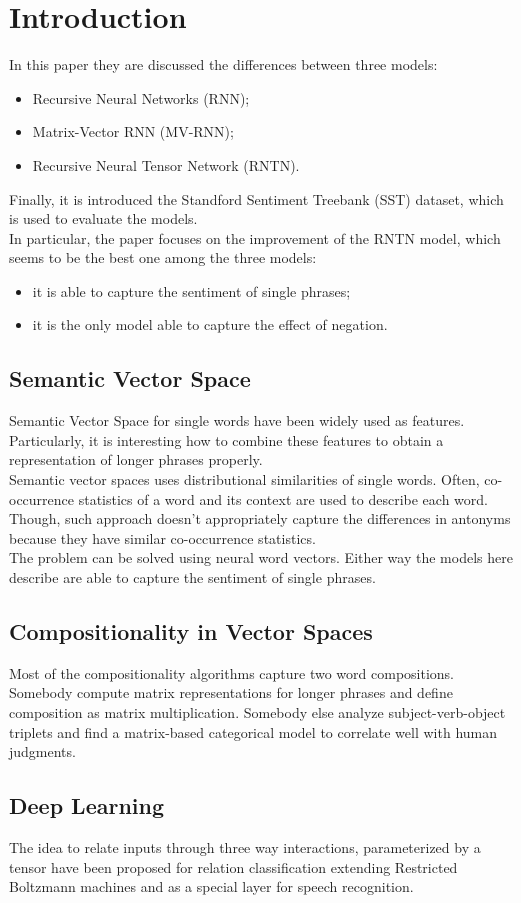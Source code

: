 \section{Introduction}

In this paper they are discussed the differences between three models:
\begin{itemize}
	\item Recursive Neural Networks (RNN);
	\item Matrix-Vector RNN (MV-RNN);
	\item Recursive Neural Tensor Network (RNTN).
\end{itemize}

Finally, it is introduced the Standford Sentiment Treebank (SST) dataset, 
which is used to evaluate the models.\\
In particular, the paper focuses on the improvement of the RNTN model, which
seems to be the best one among the three models:
\begin{itemize}
	\item it is able to capture the sentiment of single phrases;
	\item it is the only model able to capture the effect of negation.
\end{itemize}

\subsection{Semantic Vector Space}

Semantic Vector Space for single words have been widely used as features.
Particularly, it is interesting how to combine these features to obtain
a representation of longer phrases properly.\\
Semantic vector spaces uses distributional similarities of single words. Often,
co-occurrence statistics of a word and its context are used to describe each
word. Though, such approach doesn't appropriately capture the differences in
antonyms because they have similar co-occurrence statistics.\\
The problem can be solved using neural word vectors. Either way the models here
describe are able to capture the sentiment of single phrases.

\subsection{Compositionality in Vector Spaces}

Most of the compositionality algorithms capture two word compositions. Somebody
compute matrix representations for longer phrases and define composition as
matrix multiplication. Somebody else analyze subject-verb-object triplets and
find a matrix-based categorical model to correlate well with human judgments.

\subsection{Deep Learning}

The idea to relate inputs through three way interactions, parameterized by a
tensor have been proposed for relation classification extending Restricted
Boltzmann machines and as a special layer for speech recognition.
